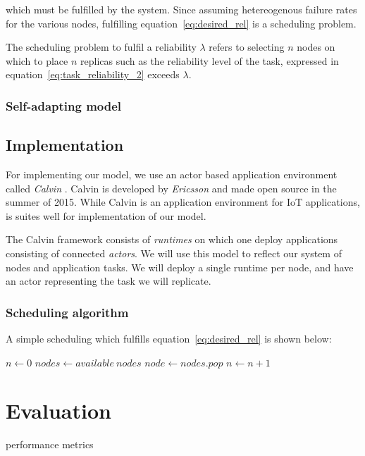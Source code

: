 \documentclass{cslthse-msc}
\begin{document}
which must be fulfilled by the system. Since assuming hetereogenous failure rates for the various nodes, fulfilling equation~\ref{eq:desired_rel} is a scheduling problem.

The scheduling problem to fulfil a reliability $\lambda$ refers to selecting $n$ nodes on which to place $n$ replicas such as the reliability level of the task, expressed in equation~\ref{eq:task_reliability_2} exceeds $\lambda$.

\subsection{Self-adapting model}


\section{Implementation} \label{sec:implementation}
For implementing our model, we use an actor based application environment called \emph{Calvin} \cite{calvin}. Calvin is developed by \emph{Ericsson} and made open source in the summer of 2015. While Calvin is an application environment for IoT applications, is suites well for implementation of our model.

The Calvin framework consists of \emph{runtimes} on which one deploy applications consisting of connected \emph{actors}. We will use this model to reflect our system of nodes and application tasks. We will deploy a single runtime per node, and have an actor representing the task we will replicate.


\subsection{Scheduling algorithm}
A simple scheduling which fulfills equation~\ref{eq:desired_rel} is shown below:

\begin{algorithmic}
\State $n\gets 0$
\State $nodes\gets available\ nodes$
	\State $node\gets nodes.pop$
	\State $n\gets n + 1$
\EndWhile
\end{algorithmic}

\chapter{Evaluation} \label{ch:evaluation}
performance metrics
\end{document}

